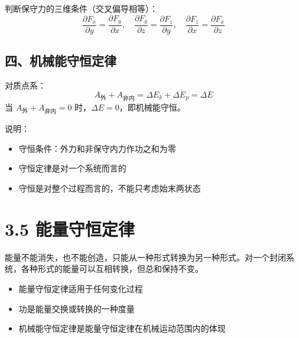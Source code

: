\documentclass{ctexart}
\begin{document}
判断保守力的三维条件（交叉偏导相等）：
\[
\frac{\partial F_x}{\partial y} = \frac{\partial F_y}{\partial x},\quad
\frac{\partial F_y}{\partial z} = \frac{\partial F_z}{\partial y},\quad
\frac{\partial F_z}{\partial x} = \frac{\partial F_x}{\partial z}
\]

\subsection*{四、机械能守恒定律}
对质点系：
\[
A_{\text{外}} + A_{\text{非内}} = \Delta E_k + \Delta E_p = \Delta E
\]
当 $A_{\text{外}} + A_{\text{非内}} = 0$ 时，$\Delta E = 0$，即机械能守恒。

说明：
\begin{itemize}
  \item 守恒条件：外力和非保守内力作功之和为零
  \item 守恒定律是对一个系统而言的
  \item 守恒是对整个过程而言的，不能只考虑始末两状态
\end{itemize}

\section*{3.5 能量守恒定律}
能量不能消失，也不能创造，只能从一种形式转换为另一种形式。对一个封闭系统，各种形式的能量可以互相转换，但总和保持不变。

\begin{itemize}
  \item 能量守恒定律适用于任何变化过程
  \item 功是能量交换或转换的一种度量
  \item 机械能守恒定律是能量守恒定律在机械运动范围内的体现
\end{itemize}
\end{document}
